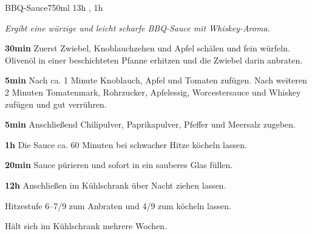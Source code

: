 \documentclass[../recipe-collections/cooking.tex]{subfiles}
\begin{document}
\begin{recipe}{BBQ-Sauce}{750ml }{13h , 1h }

  \freeform{}\textit{Ergibt eine würzige und leicht scharfe BBQ-Sauce mit Whiskey-Aroma.}


  \textbf{30min}
  Zuerst Zwiebel, Knoblauchzehen und Apfel schälen und fein würfeln.
  Olivenöl in einer beschichteten Pfanne erhitzen und die Zwiebel darin anbraten.


  \textbf{5min}
  Nach ca. 1 Minute Knoblauch, Apfel und Tomaten zufügen.
  Nach weiteren 2 Minuten Tomatenmark, Rohrzucker, Apfelessig, Worcestersauce und Whiskey zufügen und gut verrühren.


  \textbf{5min}
  Anschließend Chilipulver, Paprikapulver, Pfeffer und Meersalz zugeben.

  \newstep{}\textbf{1h}
  Die Sauce ca. 60 Minuten bei schwacher Hitze köcheln lassen.

  \newstep{}\textbf{20min}
  Sauce pürieren und sofort in ein sauberes Glas füllen.

  \newstep{}\textbf{12h}
  Anschließen im Kühlschrank über Nacht ziehen lassen.

  \freeform{}\hrulefill{}

  \freeform{}
  Hitzestufe 6–7/9 zum Anbraten und 4/9 zum köcheln lassen.

  \freeform{}
  Hält sich im Kühlschrank mehrere Wochen.

\end{recipe}
\end{document}
